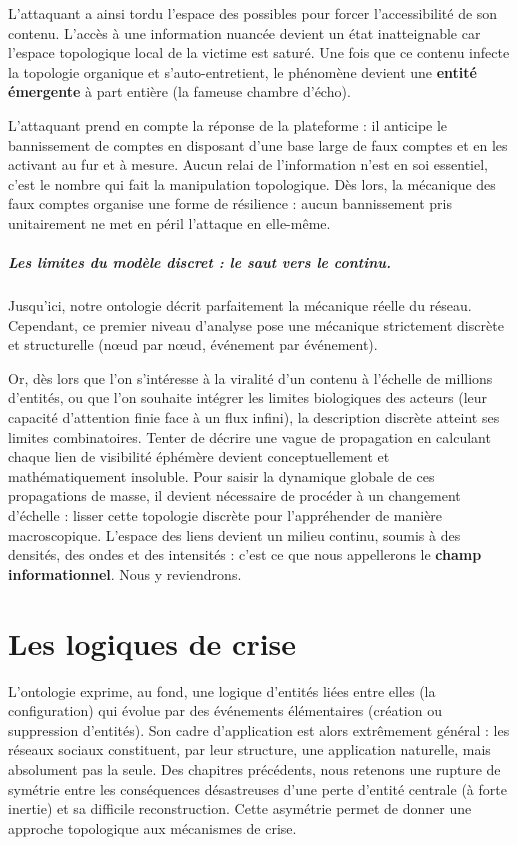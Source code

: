 \documentclass{report}
\begin{document}
	L'attaquant a ainsi \og{}tordu\fg{} l'espace des possibles pour forcer l'accessibilité de son contenu. L'accès à une information nuancée devient un état inatteignable car l'espace topologique local de la victime est saturé. Une fois que ce contenu infecte la topologie organique et s'auto-entretient, le phénomène devient une \textbf{entité émergente} à part entière (la fameuse \og{}chambre d'écho\fg{}).
	
	L'attaquant prend en compte la réponse de la plateforme : il anticipe le bannissement de comptes en disposant d'une base large de faux comptes et en les activant au fur et à mesure. Aucun relai de l'information n'est en soi essentiel, c'est le nombre qui fait la manipulation topologique. Dès lors, la mécanique des faux comptes organise une forme de résilience : aucun bannissement pris unitairement ne met en péril l'attaque en elle-même. 
	
	\paragraph{Les limites du modèle discret : le saut vers le continu.}
	Jusqu'ici, notre ontologie décrit parfaitement la mécanique réelle du réseau. Cependant, ce premier niveau d'analyse pose une mécanique strictement discrète et structurelle (nœud par nœud, événement par événement). 
	
	Or, dès lors que l'on s'intéresse à la viralité d'un contenu à l'échelle de millions d'entités, ou que l'on souhaite intégrer les limites biologiques des acteurs (leur capacité d'attention finie face à un flux infini), la description discrète atteint ses limites combinatoires. Tenter de décrire une vague de propagation en calculant chaque lien de visibilité éphémère devient conceptuellement et mathématiquement insoluble. Pour saisir la dynamique globale de ces propagations de masse, il devient nécessaire de procéder à un changement d'échelle : lisser cette topologie discrète pour l'appréhender de manière macroscopique. L'espace des liens devient un milieu continu, soumis à des densités, des ondes et des intensités : c'est ce que nous appellerons le \textbf{champ informationnel}. Nous y reviendrons.
	
	
	
	\chapter{Les logiques de crise}
	
	L'ontologie exprime, au fond, une logique d'entités liées entre elles (la configuration) qui évolue par des événements élémentaires (création ou suppression d'entités). Son cadre d'application est alors extrêmement général : les réseaux sociaux constituent, par leur structure, une application naturelle, mais absolument pas la seule. Des chapitres précédents, nous retenons une rupture de symétrie entre les conséquences désastreuses d'une perte d'entité centrale (à forte inertie) et sa difficile reconstruction. Cette asymétrie permet de donner une approche topologique aux mécanismes de crise. 
	
\end{document}
